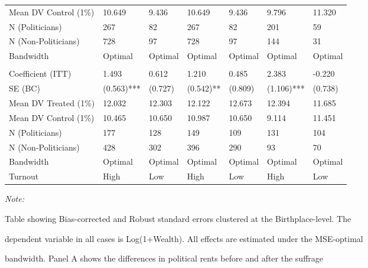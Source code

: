 \begin{table}[!h]
{\begin{threeparttable}
\begin{tabular}[t]{lllllll}
\hspace{1em}Mean DV Control (1\%) & 10.649 & 9.436 & 10.649 & 9.436 & 9.796 & 11.320\\
\hspace{1em}N (Politicians) & 267 & 82 & 267 & 82 & 201 & 59\\
\hspace{1em}N (Non-Politicians) & 728 & 97 & 728 & 97 & 144 & 31\\
\hspace{1em}Bandwidth & Optimal & Optimal & Optimal & Optimal & Optimal & \vphantom{1} Optimal\\
\addlinespace[0.3em]
\multicolumn{7}{l}{\textbf{High and Low Turnout}}\\
\hspace{1em}Coefficient (ITT) & 1.493 & 0.612 & 1.210 & 0.485 & 2.383 & -0.220\\
\hspace{1em}SE (BC) & (0.563)*** & (0.727) & (0.542)** & (0.809) & (1.106)*** & (0.738)\\
\hspace{1em}Mean DV Treated (1\%) & 12.032 & 12.303 & 12.122 & 12.673 & 12.394 & 11.685\\
\hspace{1em}Mean DV Control (1\%) & 10.465 & 10.650 & 10.987 & 10.650 & 9.114 & 11.451\\
\hspace{1em}N (Politicians) & 177 & 128 & 149 & 109 & 131 & 104\\
\hspace{1em}N (Non-Politicians) & 428 & 302 & 396 & 290 & 93 & 70\\
\hspace{1em}Bandwidth & Optimal & Optimal & Optimal & Optimal & Optimal & Optimal\\
\hspace{1em}Turnout & High & Low & High & Low & High & Low\\
\bottomrule
\end{tabular}
\begin{tablenotes}[para]
\item \textit{Note: } 
\item Table showing Bias-corrected and Robust standard errors clustered at the Birthplace-level. The
\item dependent variable in all cases is Log(1+Wealth). All effects are estimated under the MSE-optimal
\item bandwidth. Panel A shows the differences in political rents before and after the suffrage

\end{tablenotes}
\end{threeparttable}}
\end{table}
